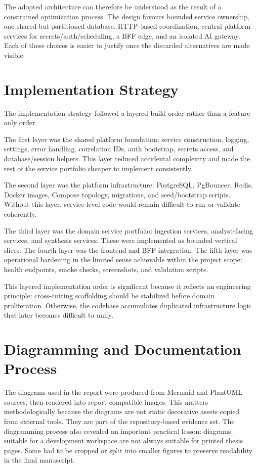 The adopted architecture can therefore be understood as the result of a constrained optimization process. The design favours bounded service ownership, one shared but partitioned database, HTTP-based coordination, central platform services for secrets/auth/scheduling, a BFF edge, and an isolated AI gateway. Each of these choices is easier to justify once the discarded alternatives are made visible.

\section{Implementation Strategy}
The implementation strategy followed a layered build order rather than a feature-only order.

The first layer was the shared platform foundation: service construction, logging, settings, error handling, correlation IDs, auth bootstrap, secrets access, and database/session helpers. This layer reduced accidental complexity and made the rest of the service portfolio cheaper to implement consistently.

The second layer was the platform infrastructure: PostgreSQL, PgBouncer, Redis, Docker images, Compose topology, migrations, and seed/bootstrap scripts. Without this layer, service-level code would remain difficult to run or validate coherently.

The third layer was the domain service portfolio: ingestion services, analyst-facing services, and synthesis services. These were implemented as bounded vertical slices. The fourth layer was the frontend and BFF integration. The fifth layer was operational hardening in the limited sense achievable within the project scope: health endpoints, smoke checks, screenshots, and validation scripts.

This layered implementation order is significant because it reflects an engineering principle: cross-cutting scaffolding should be stabilized before domain proliferation. Otherwise, the codebase accumulates duplicated infrastructure logic that later becomes difficult to unify.

\section{Diagramming and Documentation Process}
The diagrams used in the report were produced from Mermaid and PlantUML sources, then rendered into report-compatible images. This matters methodologically because the diagrams are not static decorative assets copied from external tools. They are part of the repository-based evidence set. The diagramming process also revealed an important practical lesson: diagrams suitable for a development workspace are not always suitable for printed thesis pages. Some had to be cropped or split into smaller figures to preserve readability in the final manuscript.

